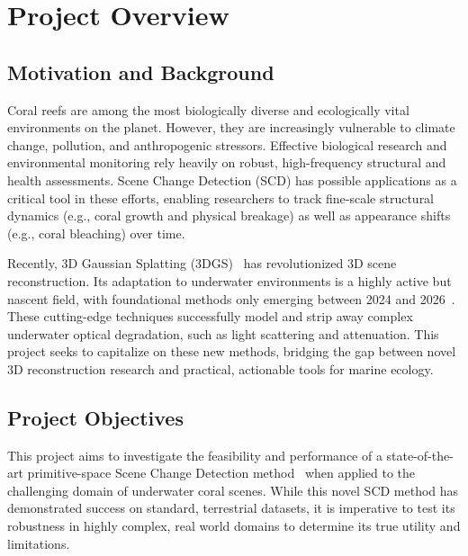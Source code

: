 \chapter{Project Overview}

\section{Motivation and Background}
Coral reefs are among the most biologically diverse and ecologically vital environments on the planet. However, they are increasingly vulnerable to climate change, pollution, and anthropogenic stressors. Effective biological research and environmental monitoring rely heavily on robust, high-frequency structural and health assessments. Scene Change Detection (SCD) has possible applications as a critical tool in these efforts, enabling researchers to track fine-scale structural dynamics (e.g., coral growth and physical breakage) as well as appearance shifts (e.g., coral bleaching) over time.

Recently, 3D Gaussian Splatting (3DGS)~\cite{10897713} has revolutionized 3D scene reconstruction. Its adaptation to underwater environments is a highly active but nascent field, with foundational methods only emerging between 2024 and 2026~\cite{11128502, article, xing2025uw3dgsunderwater3dreconstruction, 10.3389/fmars.2025.1573612}. These cutting-edge techniques successfully model and strip away complex underwater optical degradation, such as light scattering and attenuation. This project seeks to capitalize on these new methods, bridging the gap between novel 3D reconstruction research and practical, actionable tools for marine ecology.

\section{Project Objectives}
This project aims to investigate the feasibility and performance of a state-of-the-art primitive-space Scene Change Detection method~\cite{galappaththige2026pixelsprimitivesscenechange} when applied to the challenging domain of underwater coral scenes. While this novel SCD method has demonstrated success on standard, terrestrial datasets, it is imperative to test its robustness in highly complex, real world domains to determine its true utility and limitations. 


